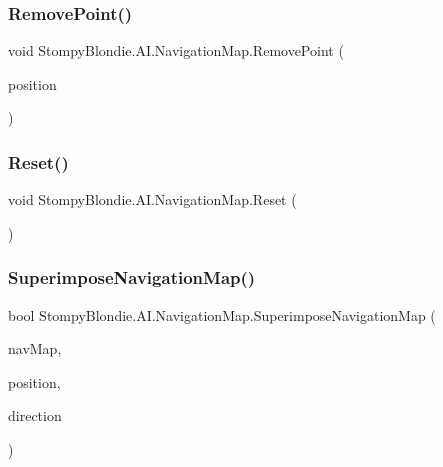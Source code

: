 \subsubsection{\texorpdfstring{Remove\+Point()}{RemovePoint()}}
{\footnotesize\ttfamily void Stompy\+Blondie.\+A\+I.\+Navigation\+Map.\+Remove\+Point (\begin{DoxyParamCaption}\item[{\mbox{\hyperlink{struct_stompy_blondie_1_1_common_1_1_types_1_1_pos}{Pos}}}]{position }\end{DoxyParamCaption})\hspace{0.3cm}{\ttfamily [inline]}}

\mbox{\label{class_stompy_blondie_1_1_a_i_1_1_navigation_map_a5922bcfcb17953ec21c868b260b41953}} 
\subsubsection{\texorpdfstring{Reset()}{Reset()}}
{\footnotesize\ttfamily void Stompy\+Blondie.\+A\+I.\+Navigation\+Map.\+Reset (\begin{DoxyParamCaption}{ }\end{DoxyParamCaption})\hspace{0.3cm}{\ttfamily [inline]}}

\mbox{\label{class_stompy_blondie_1_1_a_i_1_1_navigation_map_a059f94fa6e73419756517f761f2bb3f5}} 
\subsubsection{\texorpdfstring{Superimpose\+Navigation\+Map()}{SuperimposeNavigationMap()}}
{\footnotesize\ttfamily bool Stompy\+Blondie.\+A\+I.\+Navigation\+Map.\+Superimpose\+Navigation\+Map (\begin{DoxyParamCaption}\item[{\mbox{\hyperlink{class_stompy_blondie_1_1_a_i_1_1_navigation_map}{Navigation\+Map}}}]{nav\+Map,  }\item[{\mbox{\hyperlink{struct_stompy_blondie_1_1_common_1_1_types_1_1_pos}{Pos}}}]{position,  }\item[{\mbox{\hyperlink{namespace_stompy_blondie_1_1_common_1_1_types_a67d21ccf6a23cdea91c271cce76f920f}{Eight\+Direction}}}]{direction }\end{DoxyParamCaption})\hspace{0.3cm}{\ttfamily [inline]}}



